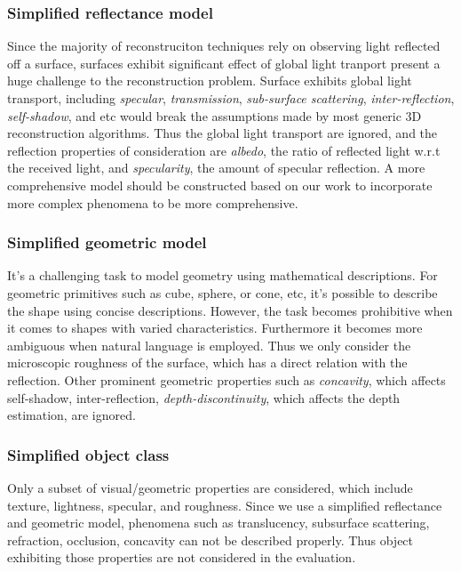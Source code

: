\subsubsection{Simplified reflectance model}
Since the majority of reconstruciton techniques rely on observing light reflected off a surface, surfaces exhibit significant effect of global light tranport present a huge challenge to the reconstruction problem. Surface exhibits global light transport, including \textit{specular}, \textit{transmission}, \textit{sub-surface scattering}, \textit{inter-reflection}, \textit{self-shadow}, and etc would break the assumptions made by most generic 3D reconstruction algorithms. Thus the global light transport are ignored, and the reflection properties of consideration are \textit{albedo}, \ie the ratio of reflected light w.r.t the received light, and \textit{specularity}, \ie the amount of specular reflection. A more comprehensive model should be constructed based on our work to incorporate more complex phenomena to be more comprehensive.

\subsubsection{Simplified geometric model}
It's a challenging task to model geometry using mathematical descriptions. For geometric primitives such as cube, sphere, or cone, etc, it's possible to describe the shape using concise descriptions. However, the task becomes prohibitive when it comes to shapes with varied characteristics. Furthermore it becomes more ambiguous when natural language is employed. Thus we only consider the microscopic roughness of the surface, which has a direct relation with the reflection. Other prominent geometric properties such as \textit{concavity}, which affects self-shadow, inter-reflection, \textit{depth-discontinuity}, which affects the depth estimation, are ignored.

\subsubsection{Simplified object class}
Only a subset of visual/geometric properties are considered, which include texture, lightness, specular, and roughness. Since we use a simplified reflectance and geometric model, phenomena such as translucency, subsurface scattering, refraction, occlusion, concavity can not be described properly. Thus object exhibiting those properties are not considered in the evaluation.

